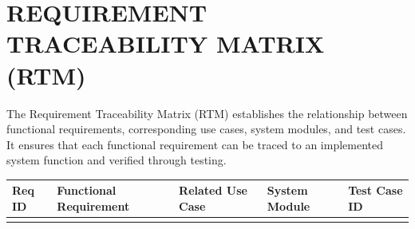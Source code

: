 \section{REQUIREMENT TRACEABILITY MATRIX (RTM)}\label{s:rtm}

The Requirement Traceability Matrix (RTM) establishes the relationship between functional requirements, corresponding use cases, system modules, and test cases. It ensures that each functional requirement can be traced to an implemented system function and verified through testing.

\vspace{1em}

\begingroup
\small
\setlength{\tabcolsep}{4pt}
\renewcommand{\arraystretch}{1.25}

\begin{xltabular}{\textwidth}{|>{\centering\arraybackslash}p{1.8cm}|>{\raggedright\arraybackslash}X|>{\raggedright\arraybackslash}p{2.8cm}|>{\raggedright\arraybackslash}p{2.2cm}|>{\centering\arraybackslash}p{1.5cm}|}
\hline
\textbf{Req ID} & \textbf{Functional Requirement} & \textbf{Related Use Case} & \textbf{System Module} & \textbf{Test Case ID} \\ \hline
\endfirsthead

\hline
\endhead

\hline
\endfoot


\end{xltabular}
